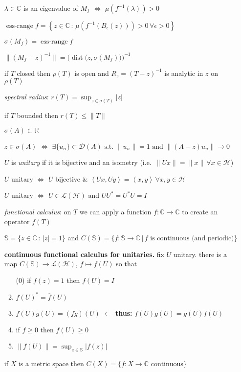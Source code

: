 \documentclass[11pt]{article}
\newcommand{\cD}{\mathcal{D}}
\newcommand{\cH}{\mathcal{H}}
\newcommand{\cL}{\mathcal{L}}
\newcommand{\CC}{\mathbb{C}}
\newcommand{\RR}{\mathbb{R}}
\renewcommand{\SS}{\mathbb{S}}
\newcommand{\ip}[2]{\left<#1,#2\right>}
\newcommand{\eps}{\epsilon}
\begin{document}
\begin{itemize}[leftmargin=10mm,itemsep=0mm]
$\lambda\in\CC$ is an eigenvalue of $M_f$ $\iff$ $\mu(f^{-1}(\lambda))>0$
\item[\df{71}] $\operatorname{ess-range} f = \left\{z\in\CC\,:\,\mu(f^{-1}(B_\eps(z))) > 0 \, \forall \eps>0\right\}$
\item[\ft{71}] $\sigma(M_f) = \operatorname{ess-range} f$
\item[\ft{71}] $\|(M_f - z)^{-1}\| = \Big(\operatorname{dist}\big(z,\sigma(M_f)\big)\Big)^{-1}$
\item[\ft{83}] if $T$ closed then $\rho(T)$ is open and $R_z = (T-z)^{-1}$ is analytic in $z$ on $\rho(T)$
\item[\df{85}] \emph{spectral radius}: $r(T) = \sup_{z \in \sigma(T)} |z|$
\item[\ft{85}] if $T$ bounded then $r(T) \le \|T\|$
\item[\ft{86}] $\sigma(A)\subset \RR$
\item[\ft{87}] $z\in\sigma(A)$ $\iff$ $\exists \{u_n\}\subset \cD(A) \text{ s.t.~} \|u_n\|=1 \text{ and } \|(A-z)u_n\| \to 0$
\item[\df{17}] $U$ is \emph{unitary} if it is bijective and an isometry (i.e.~$\|Ux\|=\|x\|\,\forall x\in\cH$)
\item[\ft{17}] $U$ unitary $\iff$ $U$ bijective \& $\ip{Ux}{Uy}=\ip{x}{y}\,\forall x,y\in\cH$
\item[\ft{102}] $U$ unitary $\iff$ $U\in\cL(\cH)$ and $UU^* = U^*U=I$
\item[\df{102}] \emph{functional calculus}: on $T$ we can apply a function $f:\CC\to\CC$ to create an operator $f(T)$
\item[\df{102}] $\SS = \{z\in\CC\,:\,|z|=1\}$ and $C(\SS)=\{f:\SS\to\CC\,|\,f \text{ is continuous (and periodic)}\}$
\item[\ft{103}] \textbf{continuous functional calculus for unitaries.} fix $U$ unitary. there is a map $C(\SS) \to \cL(\cH)$, $f\mapsto f(U)$ so that
\renewcommand{\labelenumi}{(\alph{enumi})}
\begin{enumerate}
\item[(0)] if $f(z) = 1$ then $f(U) = I$
\setcounter{enumi}{0}
\item $f(U)^*=\overline{f}(U)$
\item $f(U)g(U) = (fg)(U)$ \hfill {\footnotesize $\leftarrow$ \textbf{thus:} $f(U)g(U)=g(U)f(U)$}
\item if $f\ge 0$ then $f(U)\ge 0$
\item $\|f(U)\| = \sup_{z\in\SS} |f(z)|$
\end{enumerate}
\item[\df{105}] if $X$ is a metric space then $C(X) = \{f:X\to\CC \text{ continuous}\}$

\end{itemize}
\end{document}
